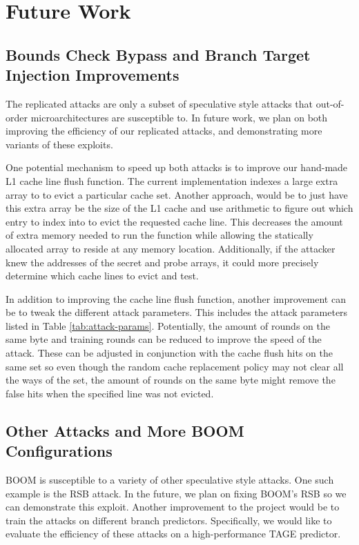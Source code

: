 \section{Future Work} \label{Future Work}

\subsection{Bounds Check Bypass and Branch Target Injection Improvements}

The replicated attacks are only a subset of speculative style attacks that out-of-order
microarchitectures are susceptible to. In future work, we plan on both improving the efficiency of
our replicated attacks, and demonstrating more variants of these exploits.

One potential mechanism to speed up both attacks is to improve our hand-made L1 cache line flush
function. The current implementation indexes a large extra array to to evict a particular cache set.
Another approach, would be to just have this extra array be the size of the L1 cache and use
arithmetic to figure out which entry to index into to evict the requested cache line.
This decreases the amount of extra memory needed to run the function while allowing the statically
allocated array to reside at any memory location. Additionally, if the attacker knew the addresses of
the secret and probe arrays, it could more precisely determine which cache lines to evict and test.

In addition to improving the cache line flush function, another
improvement can be to tweak the different attack parameters. This includes
the attack parameters listed in Table \ref{tab:attack-params}. Potentially, the amount of rounds on the
same byte and training rounds can be reduced to improve the speed of the attack.
These can be adjusted in conjunction with the cache flush hits on the same set so even though the 
random cache replacement policy may not clear all the ways of the set, the amount of rounds on
the same byte might remove the false hits when the specified line was not evicted.

\subsection{Other Attacks and More BOOM Configurations}

BOOM is susceptible to a variety of other speculative style attacks. One such example is the RSB
attack. In the future, we plan on fixing BOOM's RSB so we can demonstrate this exploit.
Another improvement to the project would be to train the attacks on different branch predictors.
Specifically, we would like to evaluate the efficiency of these attacks on a high-performance
TAGE predictor.


